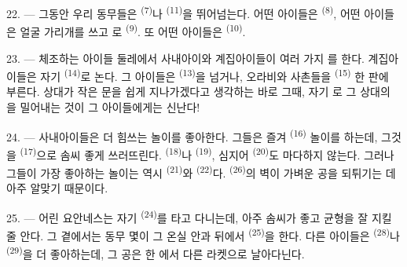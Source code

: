 22. --- 그동안 우리 동무들은 \textsuperscript{(7)}나
\textsuperscript{(11)}을 뛰어넘는다. 어떤 아이들은
\textsuperscript{(8)}, 어떤 아이들은 얼굴 가리개를 쓰고
로 \textsuperscript{(9)}. 또 어떤 아이들은
\textsuperscript{(10)}.

\VUsaut{4.6mm}
\VUsaut{3.0mm}

23. --- 체조하는 아이들 둘레에서 사내아이와 계집아이들이 여러 가지 를 한다.
계집아이들은 자기 \textsuperscript{(14)}로 논다. 그 아이들은
\textsuperscript{(13)}을 넘거나, 오라비와 사촌들을
\textsuperscript{(15)} 한 판에 부른다. 상대가 작은 문을 쉽게 지나가겠다고
생각하는 바로 그때, 자기 로 그 상대의 을 밀어내는 것이 그
아이들에게는 신난다!

24. --- 사내아이들은 더 힘쓰는 놀이를 좋아한다. 그들은 즐겨
\textsuperscript{(16)} 놀이를 하는데, 그것을
\textsuperscript{(17)}으로 솜씨 좋게 쓰러뜨린다.
\textsuperscript{(18)}나 \textsuperscript{(19)}, 심지어
\textsuperscript{(20)}도 마다하지 않는다. 그러나 그들이 가장 좋아하는
놀이는 역시 \textsuperscript{(21)}와
\textsuperscript{(22)}다. \textsuperscript{(26)}의 벽이
가벼운 공을 되튀기는 데 아주 알맞기 때문이다.

25. --- 어린 요안네스는 자기 \textsuperscript{(24)}를 타고 다니는데, 아주
솜씨가 좋고 균형을 잘 지킬 줄 안다. 그 곁에서는 동무 몇이 그 온실 안과 
뒤에서 \textsuperscript{(25)}을 한다. 다른 아이들은
\textsuperscript{(28)}나
\textsuperscript{(29)}을 더 좋아하는데, 그 공은 한 에서 다른
라켓으로 날아다닌다.



